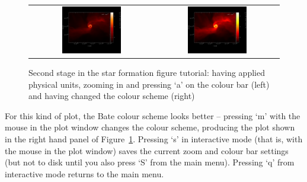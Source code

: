 \documentclass[a4paper,11pt]{article}
\begin{document}
\begin{figure}[h]
\begin{center}
\begin{tabular}{cc}
\includegraphics[width=0.5\textwidth]{starpart3.png} &
\includegraphics[width=0.5\textwidth]{starpart4.png}
\end{tabular}
\caption{Second stage in the star formation figure tutorial: having applied physical units, zooming in and pressing `a' on the colour bar (left) and having changed the colour scheme (right)}
\label{fig:starpart2}
\end{center}
\end{figure}
 For this kind of plot, the Bate colour scheme looks better -- pressing `m' with the mouse in the plot window changes the colour scheme, producing the plot shown in the right hand panel of Figure~\ref{fig:starpart2}. Pressing `s' in interactive mode (that is, with the mouse in the plot window) saves the current zoom and colour bar settings (but not to disk until you also press `S' from the main menu). Pressing `q' from interactive mode returns to the main menu.
 
\end{document}
